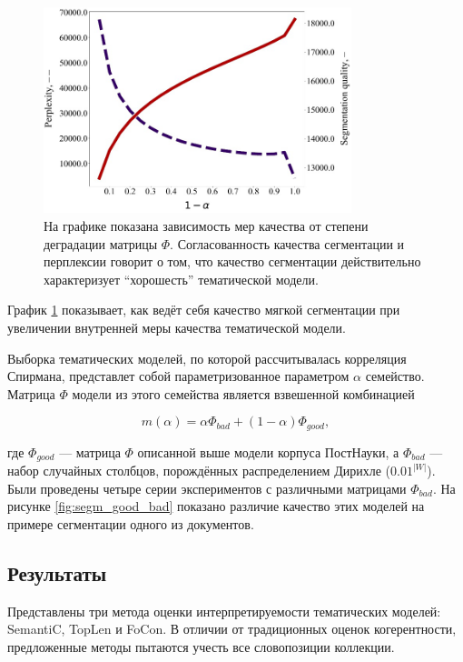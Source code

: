 \begin{figure}
    \centering
    \includegraphics[width=0.8\textwidth]{images/segm_1.png}
    \caption{  На графике показана зависимость мер качества от степени деградации матрицы $\Phi$. Согласованность качества сегментации и перплексии говорит о том, что качество сегментации действительно характеризует ``хорошесть'' тематической модели.}
    \label{plot:segm_quality-iteration}
\end{figure}

График \ref{plot:segm_quality-iteration} показывает, как ведёт себя качество мягкой сегментации при увеличении внутренней меры качества тематической модели.

Выборка тематических моделей, по которой рассчитывалась корреляция Спирмана, представлет собой параметризованное параметром $\alpha$ семейство. Матрица $\Phi$ модели из этого семейства является взвешенной комбинацией

\[
m(\alpha) = \alpha \Phi_{bad} + (1-\alpha)\Phi_{good},
\]

где $\Phi_{good}$ --- матрица $\Phi$ описанной выше модели корпуса ПостНауки, а $\Phi_{bad}$ --- набор случайных столбцов, порождённых распределением Дирихле ($0.01^{|W|}$). Были проведены четыре серии экспериментов с различными матрицами $\Phi_{bad}$. На рисунке \ref{fig:segm_good_bad} показано различие качество этих моделей на примере сегментации одного из документов.

\subsection{Результаты}
Представлены три метода оценки интерпретируемости тематических моделей: SemantiC, TopLen и FoCon. В отличии от традиционных оценок когерентности, предложенные методы пытаются учесть все словопозиции коллекции.

